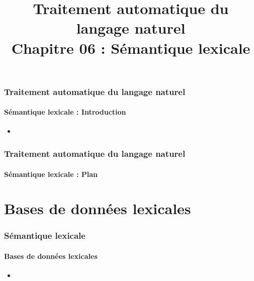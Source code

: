 \documentclass[xcolor=table]{beamer}
\title[TALN : 06- Sémantique lexicale]%
{Traitement automatique du langage naturel\\Chapitre 06 : Sémantique lexicale}
\begin{document}
	
\begin{frame}
\frametitle{Traitement automatique du langage naturel}
\framesubtitle{Sémantique lexicale : Introduction}

%		

\begin{itemize}
	\item 
\end{itemize}

\end{frame}

%
%

\begin{frame}
\frametitle{Traitement automatique du langage naturel}
\framesubtitle{Sémantique lexicale : Plan}

\begin{multicols}{2}
\tableofcontents
\end{multicols}
\end{frame}

\section{Bases de données lexicales}

\begin{frame}
	\frametitle{Sémantique lexicale}
	\framesubtitle{Bases de données lexicales}
	
	\begin{itemize}
		\item 	
	\end{itemize}
	
\end{frame}
\end{document}
